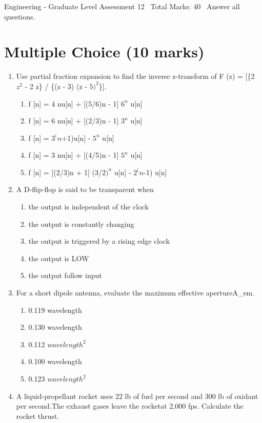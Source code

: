 \documentclass[12pt]{article}
\begin{document}
\begin{center}
Engineering - Graduate Level Assessment 12 \
Total Marks: 40 \
Answer all questions.
\end{center}

\section*{Multiple Choice (10 marks)}
\begin{enumerate}[label=\arabic*.]
\item Use partial fraction expansion to find the inverse z-transform of F (z) = [\{2 $z^2$ - 2 z\} / \{(z - 3) (z - $5)^2$\}].
\begin{enumerate}[label=(\alph*)]
    \item f [n] = 4 nu[n] + [(5/6)n - 1] $6^n$ u[n]
    \item f [n] = 6 nu[n] + [(2/3)n - 1] $3^n$ u[n]
    \item f [n] = $3^(n$+1)u[n] - $5^n$ u[n]
    \item f [n] = 3 nu[n] + [(4/5)n - 1] $5^n$ u[n]
    \item f [n] = [(2/3)n + 1] (3/$2)^n$ u[n] - $2^(n$-1) u[n]
\end{enumerate}
\item A D-flip-flop is said to be transparent when
\begin{enumerate}[label=(\alph*)]
    \item the output is independent of the clock
    \item the output is constantly changing
    \item the output is triggered by a rising edge clock
    \item the output is LOW
    \item the output follow input
\end{enumerate}
\item For a short dipole antenna, evaluate the maximum effective apertureA\_em.
\begin{enumerate}[label=(\alph*)]
    \item 0.119 wavelength
    \item 0.130 wavelength
    \item 0.112 $wavelength^2$
    \item 0.100 wavelength
    \item 0.123 $wavelength^2$
\end{enumerate}
\item A liquid-propellant rocket uses 22 lb of fuel per second and 300 lb of oxidant per second.The exhaust gases leave the rocketat 2,000 fps. Calculate the rocket thrust.

\end{enumerate}
\end{document}

